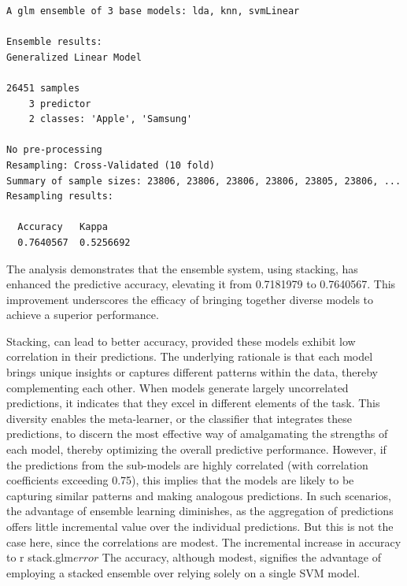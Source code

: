 \begin{verbatim}
A glm ensemble of 3 base models: lda, knn, svmLinear

Ensemble results:
Generalized Linear Model 

26451 samples
    3 predictor
    2 classes: 'Apple', 'Samsung' 

No pre-processing
Resampling: Cross-Validated (10 fold) 
Summary of sample sizes: 23806, 23806, 23806, 23806, 23805, 23806, ... 
Resampling results:

  Accuracy   Kappa    
  0.7640567  0.5256692
\end{verbatim}

The analysis demonstrates that the ensemble system, using
stacking, has enhanced the predictive accuracy, elevating it from
0.7181979 to 0.7640567. This improvement underscores the efficacy of
bringing together diverse models to achieve a superior performance.

Stacking, can lead to better accuracy, provided these models exhibit low
correlation in their predictions. The underlying rationale is that each model brings unique insights or captures different patterns
within the data, thereby complementing each other. When models generate
largely uncorrelated predictions, it indicates that they excel in
different elements of the task. This diversity enables the
meta-learner, or the classifier that integrates these predictions, to
discern the most effective way of amalgamating the strengths of each
model, thereby optimizing the overall predictive performance. However,
if the predictions from the sub-models are highly correlated (with
correlation coefficients exceeding 0.75), this implies that the models are
likely to be capturing similar patterns and making analogous predictions. In
such scenarios, the advantage of ensemble learning diminishes, as the
aggregation of predictions offers little incremental value over the
individual predictions. But this is not the case here, since the
correlations are modest. The incremental increase in accuracy to r
stack.glm\(error\) The accuracy, although modest, signifies the advantage of
employing a stacked ensemble over relying solely on a single SVM model.

\begin{Shaded}
\begin{Highlighting}[]
\end{Highlighting}
\end{Shaded}


